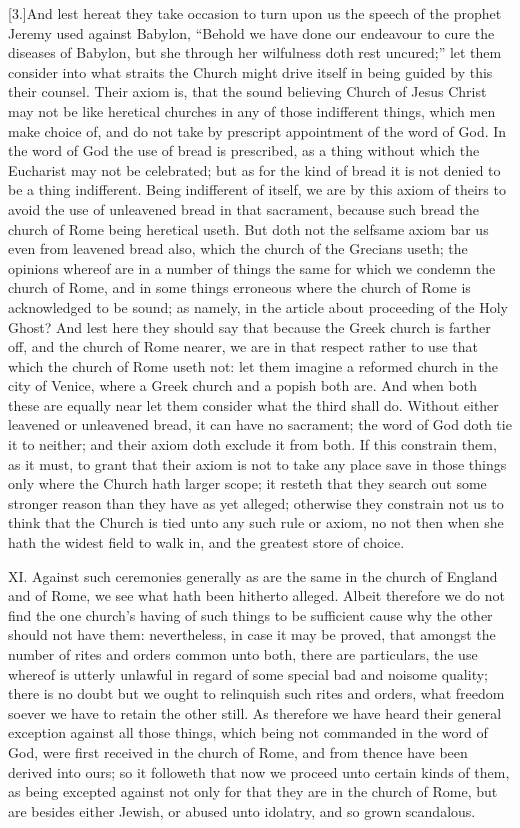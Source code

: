 [3.]And lest hereat they take occasion to turn upon us the speech of the prophet Jeremy used against Babylon, “Behold we have done our endeavour to cure the diseases of Babylon, but she through her wilfulness doth rest uncured;” let them consider into what straits the Church might drive itself in being guided by this their counsel. Their axiom is, that the sound believing Church of Jesus Christ may not be like heretical churches in any of those indifferent things, which men make choice of, and do not take by prescript appointment of the word of God. In the word of God the use of bread is prescribed, as a thing without which the Eucharist may not be celebrated; but as for the kind of bread it is not denied to be a thing indifferent. Being indifferent of itself, we are by this axiom of theirs to avoid the use of unleavened bread in that sacrament, because such bread the church of Rome being heretical useth. But doth not the selfsame axiom bar us even from leavened bread also, which the church of the Grecians useth; the opinions whereof are in a number of things the same for which we condemn the church of Rome, and in some things erroneous where the church of Rome is acknowledged to be sound; as namely, in the article about proceeding of the Holy Ghost? And lest here they should say that because the Greek church is farther off, and the church of Rome nearer, we are in that respect rather to use that which the church of Rome useth not: let them imagine a reformed church in the city of Venice, where a Greek church and a popish both are. And when both these are equally near let them consider what the third shall do. Without either leavened or unleavened bread, it can have no sacrament; the word of God doth tie it to neither; and their axiom doth exclude it from both. If this constrain them, as it must, to grant that their axiom is not to take any place save in those things only where the Church hath larger scope; it resteth that they search out some stronger reason than they have as yet alleged; otherwise they constrain not us to think that the Church is tied unto any such rule or axiom, no not then when  she hath the widest field to walk in, and the greatest store of choice.

XI. Against such ceremonies generally as are the same in the church of England and of Rome, we see what hath been hitherto alleged. Albeit therefore we do not find the one church’s having of such things to be sufficient cause why the other should not have them: nevertheless, in case it may be proved, that amongst the number of rites and orders common unto both, there are particulars, the use whereof is utterly unlawful in regard of some special bad and noisome quality; there is no doubt but we ought to relinquish such rites and orders, what freedom soever we have to retain the other still. As therefore we have heard their general exception against all those things, which being not commanded in the word of God, were first received in the church of Rome, and from thence have been derived into ours; so it followeth that now we proceed unto certain kinds of them, as being excepted against not only for that they are in the church of Rome, but are besides either Jewish, or abused unto idolatry, and so grown scandalous.

